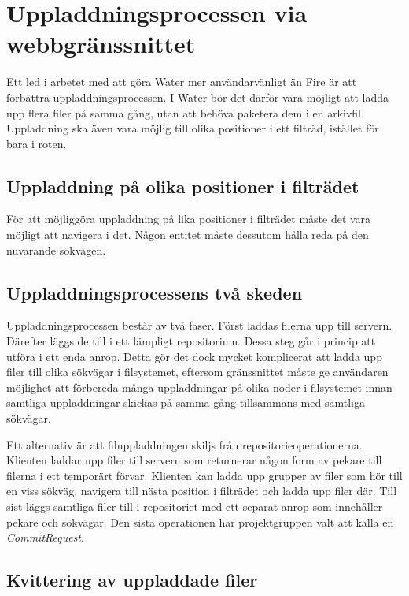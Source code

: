 \section{Uppladdningsprocessen via webbgränssnittet}

Ett led i arbetet med att göra Water mer användarvänligt än Fire är att förbättra uppladdningsprocessen. I Water bör det därför vara möjligt att ladda upp flera filer på samma gång, utan att behöva paketera dem i en arkivfil. Uppladdning ska även vara möjlig till olika positioner i ett filträd, istället för bara i roten.

\subsection{Uppladdning på olika positioner i filträdet}

För att möjliggöra uppladdning på lika positioner i filträdet måste det vara möjligt att navigera i det. Någon entitet måste dessutom hålla reda på den nuvarande sökvägen.

\subsection{Uppladdningsprocessens två skeden}
Uppladdningsprocessen består av två faser. Först laddas filerna upp till servern. Därefter läggs de till i ett lämpligt repositorium. Dessa steg går i princip att utföra i ett enda anrop. Detta gör det dock mycket komplicerat att ladda upp filer till olika sökvägar i filsystemet, eftersom gränssnittet  måste ge användaren möjlighet att förbereda många uppladdningar på olika noder i filsystemet innan samtliga uppladdningar skickas på samma gång tillsammans med samtliga sökvägar.

Ett alternativ är att filuppladdningen skiljs från repositorieoperationerna. Klienten laddar upp filer till servern som returnerar någon form av pekare till filerna i ett temporärt förvar. Klienten kan ladda upp grupper av filer som hör till en viss sökväg, navigera till nästa position i filträdet och ladda upp filer där. Till sist läggs samtliga filer till i repositoriet med ett separat anrop som innehåller pekare och sökvägar. Den sista operationen har projektgruppen valt att kalla en \emph{CommitRequest}.

\subsection{Kvittering av uppladdade filer}

